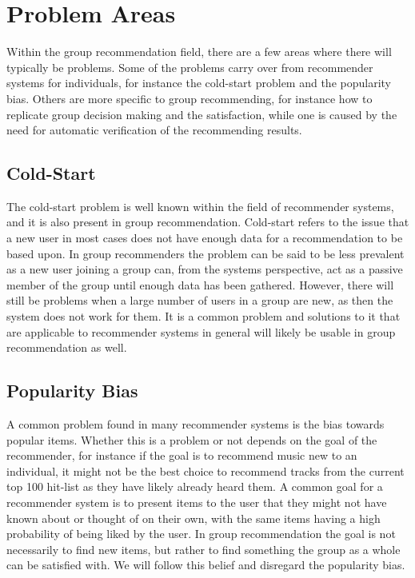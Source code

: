 \section{Problem Areas} \label{sec:problemareas}

Within the group recommendation field, there are a few areas where there will typically be problems. Some of the problems carry over from recommender systems for individuals, for instance the cold-start problem and the popularity bias. Others are more specific to group recommending, for instance how to replicate group decision making and the satisfaction, while one is caused by the need for automatic verification of the recommending results.

\subsection{Cold-Start}
The cold-start problem is well known within the field of recommender systems, and it is also present in group recommendation\cite{recsyshandbookagreggation}. Cold-start refers to the issue that a new user in most cases does not have enough data for a recommendation to be based upon. In group recommenders the problem can be said to be less prevalent as a new user joining a group can, from the systems perspective, act as a passive member of the group until enough data has been gathered. However, there will still be problems when a large number of users in a group are new, as then the system does not work for them. It is a common problem and solutions to it that are applicable to recommender systems in general will likely be usable in group recommendation as well.

\subsection{Popularity Bias}
A common problem found in many recommender systems is the bias towards popular items\cite{popbias}. Whether this is a problem or not depends on the goal of the recommender, for instance if the goal is to recommend music new to an individual, it might not be the best choice to recommend tracks from the current top 100 hit-list as they have likely already heard them. A common goal for a recommender system is to present items to the user that they might not have known about or thought of on their own, with the same items having a high probability of being liked by the user. In group recommendation the goal is not necessarily to find new items, but rather to find something the group as a whole can be satisfied with. We will follow this belief and disregard the popularity bias.

